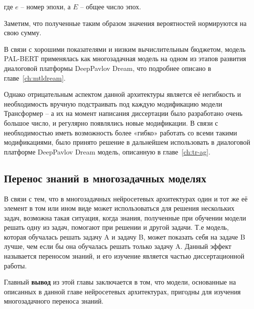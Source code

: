  где $e$ -- номер эпохи, а $E$ -- общее число эпох. 
 
Заметим, что полученные таким образом значения вероятностей нормируются на свою сумму. 

В связи с хорошими показателями и низким вычислительным бюджетом, модель PAL-BERT применялась как многозадачная модель на одном из этапов развития диалоговой платформы DeepPavlov Dream, что подробнее описано в главе~\ref{ch:mtldream}.

Однако отрицательным аспектом данной архитектуры является её негибкость и необходимость вручную подстраивать под каждую модификацию модели Трансформер -- а их на момент написания диссертации было разработано очень большое число, и регулярно появлялись новые модификации. В связи с необходимостью иметь возможность более «гибко» работать со всеми такими модификациями, было принято решение в дальнейшем использовать в диалоговой платформе {DeepPavlov Dream} модель, описанную в главе~\ref{ch:tr-ag}.

\subsection{Перенос знаний в многозадачных моделях}

В связи с тем, что в многозадачных нейросетевых архитектурах один и тот же её элемент в том или ином виде может использоваться для решения нескольких задач, возможна такая ситуация, когда знания, полученные при обучении модели решать одну из задач, помогают при решении и другой задачи. Т.е модель, которая обучалась решать задачу A и задачу B, может показать себя на задаче B лучше, чем если бы она обучалась решать только задачу A. Данный эффект называется переносом знаний, и его изучение является частью диссертационной работы. 

Главный \textbf{вывод} из этой главы заключается в том, что модели, основанные на описанных в данной главе нейросетевых архитектурах, пригодны для изучения многозадачного переноса знаний.